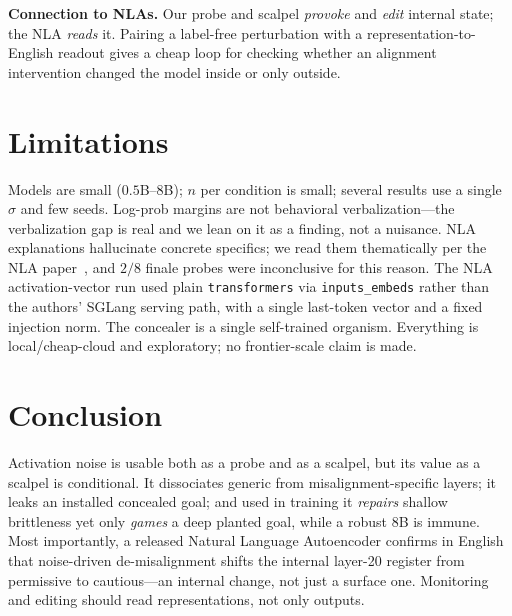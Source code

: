 \documentclass[11pt]{article}
\begin{document}
\textbf{Connection to NLAs.} Our probe and scalpel \emph{provoke} and \emph{edit} internal state; the NLA
\emph{reads} it. Pairing a label-free perturbation with a representation-to-English readout gives a cheap loop
for checking whether an alignment intervention changed the model inside or only outside.

\section{Limitations}
Models are small ($0.5$B--$8$B); $n$ per condition is small; several results use a single $\sigma$ and few seeds.
Log-prob margins are not behavioral verbalization---the verbalization gap is real and we lean on it as a finding,
not a nuisance. NLA explanations hallucinate concrete specifics; we read them thematically per the NLA
paper~\cite{nla}, and $2/8$ finale probes were inconclusive for this reason. The NLA activation-vector run used
plain \texttt{transformers} via \texttt{inputs\_embeds} rather than the authors' SGLang serving path, with a
single last-token vector and a fixed injection norm. The concealer is a single self-trained organism. Everything
is local/cheap-cloud and exploratory; no frontier-scale claim is made.

\section{Conclusion}
Activation noise is usable both as a probe and as a scalpel, but its value as a scalpel is conditional. It
dissociates generic from misalignment-specific layers; it leaks an installed concealed goal; and used in
training it \emph{repairs} shallow brittleness yet only \emph{games} a deep planted goal, while a robust 8B is
immune. Most importantly, a released Natural Language Autoencoder confirms in English that noise-driven
de-misalignment shifts the internal layer-20 register from permissive to cautious---an internal change, not
just a surface one. Monitoring and editing should read representations, not only outputs.
\end{document}
